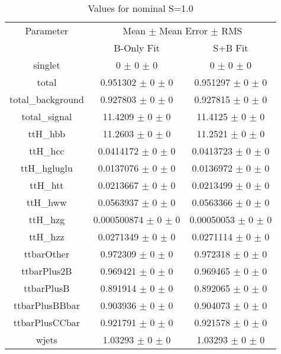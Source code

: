 \begin{table}
\centering
\caption{Values for nominal S=1.0}
\begin{tabular}{ccc}
\toprule
Parameter 	& \multicolumn{2}{c}{Mean $\pm$ Mean Error $\pm$ RMS}\\
 	& B-Only Fit & S+B Fit\\
\midrule
singlet 	& \num{0} $\pm$ \num{0} $\pm$ \num{0} 	& \num{0} $\pm$ \num{0} $\pm$ \num{0}\\
total 	& \num{0.951302} $\pm$ \num{0} $\pm$ \num{0} 	& \num{0.951297} $\pm$ \num{0} $\pm$ \num{0}\\
total\_background 	& \num{0.927803} $\pm$ \num{0} $\pm$ \num{0} 	& \num{0.927815} $\pm$ \num{0} $\pm$ \num{0}\\
total\_signal 	& \num{11.4209} $\pm$ \num{0} $\pm$ \num{0} 	& \num{11.4125} $\pm$ \num{0} $\pm$ \num{0}\\
ttH\_hbb 	& \num{11.2603} $\pm$ \num{0} $\pm$ \num{0} 	& \num{11.2521} $\pm$ \num{0} $\pm$ \num{0}\\
ttH\_hcc 	& \num{0.0414172} $\pm$ \num{0} $\pm$ \num{0} 	& \num{0.0413723} $\pm$ \num{0} $\pm$ \num{0}\\
ttH\_hgluglu 	& \num{0.0137076} $\pm$ \num{0} $\pm$ \num{0} 	& \num{0.0136972} $\pm$ \num{0} $\pm$ \num{0}\\
ttH\_htt 	& \num{0.0213667} $\pm$ \num{0} $\pm$ \num{0} 	& \num{0.0213499} $\pm$ \num{0} $\pm$ \num{0}\\
ttH\_hww 	& \num{0.0563937} $\pm$ \num{0} $\pm$ \num{0} 	& \num{0.0563366} $\pm$ \num{0} $\pm$ \num{0}\\
ttH\_hzg 	& \num{0.000500874} $\pm$ \num{0} $\pm$ \num{0} 	& \num{0.00050053} $\pm$ \num{0} $\pm$ \num{0}\\
ttH\_hzz 	& \num{0.0271349} $\pm$ \num{0} $\pm$ \num{0} 	& \num{0.0271114} $\pm$ \num{0} $\pm$ \num{0}\\
ttbarOther 	& \num{0.972309} $\pm$ \num{0} $\pm$ \num{0} 	& \num{0.972318} $\pm$ \num{0} $\pm$ \num{0}\\
ttbarPlus2B 	& \num{0.969421} $\pm$ \num{0} $\pm$ \num{0} 	& \num{0.969465} $\pm$ \num{0} $\pm$ \num{0}\\
ttbarPlusB 	& \num{0.891914} $\pm$ \num{0} $\pm$ \num{0} 	& \num{0.892065} $\pm$ \num{0} $\pm$ \num{0}\\
ttbarPlusBBbar 	& \num{0.903936} $\pm$ \num{0} $\pm$ \num{0} 	& \num{0.904073} $\pm$ \num{0} $\pm$ \num{0}\\
ttbarPlusCCbar 	& \num{0.921791} $\pm$ \num{0} $\pm$ \num{0} 	& \num{0.921578} $\pm$ \num{0} $\pm$ \num{0}\\
wjets 	& \num{1.03293} $\pm$ \num{0} $\pm$ \num{0} 	& \num{1.03293} $\pm$ \num{0} $\pm$ \num{0}\\
\bottomrule
\end{tabular}
\end{table}